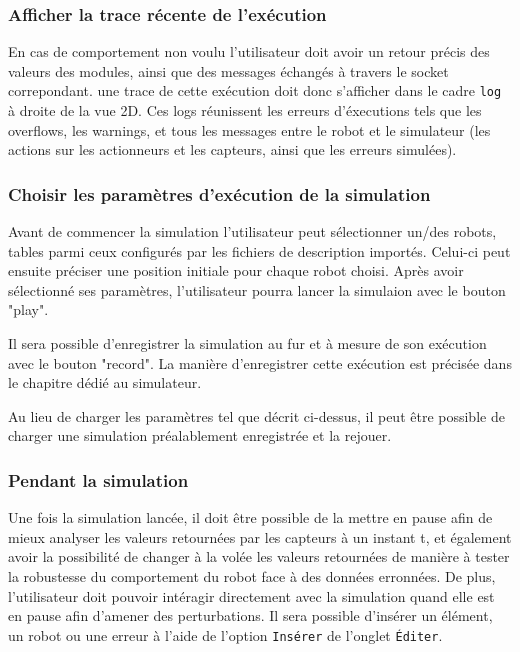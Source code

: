 \subsubsection{Afficher la trace récente de l'exécution}
En cas de comportement non voulu l'utilisateur doit avoir un retour précis des valeurs des modules, ainsi que des messages échangés à travers le socket correpondant. une trace de cette exécution doit donc s'afficher dans le cadre \texttt{log} à droite de la vue 2D. Ces logs réunissent les erreurs d'éxecutions tels que les overflows, les warnings, et tous les messages entre le robot et le simulateur (les actions sur les actionneurs et les capteurs, ainsi que les erreurs simulées).

\subsubsection{Choisir les paramètres d'exécution de la simulation}
Avant de commencer la simulation l'utilisateur peut sélectionner un/des robots, tables parmi ceux configurés par les fichiers de description importés.
Celui-ci peut ensuite préciser une position initiale pour chaque robot choisi.
Après avoir sélectionné ses paramètres, l'utilisateur pourra lancer la simulaion avec le bouton "play".

Il sera possible d'enregistrer la simulation au fur et à mesure de son exécution avec le bouton "record". La manière d'enregistrer cette exécution est précisée dans le chapitre dédié au simulateur.

Au lieu de charger les paramètres tel que décrit ci-dessus, il peut être possible de charger une simulation préalablement enregistrée et la rejouer.


\subsubsection{Pendant la simulation}
Une fois la simulation lancée, il doit être possible de la mettre en pause afin de mieux analyser les valeurs retournées par les capteurs à un instant t, et également avoir la possibilité de changer à la volée les valeurs retournées de manière à tester la robustesse du comportement du robot face à des données erronnées.
De plus, l'utilisateur doit pouvoir intéragir directement avec la simulation quand elle est en pause afin d'amener des perturbations. Il sera possible d'insérer un élément, un robot ou une erreur à l'aide de l'option \texttt{Insérer} de l'onglet \texttt{\'Editer}.







